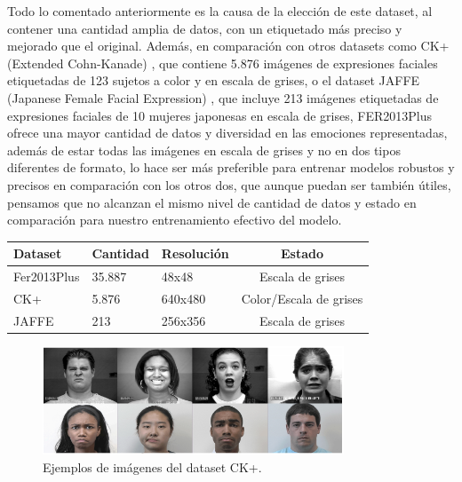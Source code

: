 \documentclass[12pt]{report} %
\begin{document}
Todo lo comentado anteriormente es la causa de la elección de este dataset, al contener una cantidad amplia de datos, con un etiquetado más preciso y mejorado que el original. Además, en comparación con otros datasets como CK+ (Extended Cohn-Kanade) \cite{ckPlus}, que contiene 5.876 imágenes de expresiones faciales etiquetadas de 123 sujetos a color y en escala de grises, o el dataset JAFFE (Japanese Female Facial Expression) \cite{jaffeDataset}, que incluye 213 imágenes etiquetadas de expresiones faciales de 10 mujeres japonesas en escala de grises, FER2013Plus ofrece una mayor cantidad de datos y diversidad en las emociones representadas, además de estar todas las imágenes en escala de grises y no en dos tipos diferentes de formato, lo hace ser más preferible para entrenar modelos robustos y precisos en comparación con los otros dos, que aunque puedan ser también útiles, pensamos que no alcanzan el mismo nivel de cantidad de datos y estado en comparación para nuestro entrenamiento efectivo del modelo.

\begin{table}[H]
	{
	  \begin{tabular}{|P{3cm}|P{3cm}|P{3cm}|c|}
		\hline
		{\textbf{Dataset}} & {\textbf{Cantidad}} & {\textbf{Resolución}} & {\textbf{Estado}} \\
		\hline
		Fer2013Plus & 35.887 & 48x48 & Escala de grises \\
		\hline
		CK+ & 5.876 & 640x480 & Color/Escala de grises \\
		\hline
		JAFFE & 213 & 256x356 & Escala de grises\\
		\hline
	  \end{tabular}
	}
\end{table}

\begin{figure}[H]
	\centering
	\includegraphics[width=0.8\textwidth]{ck+Examples.png}
	\caption{Ejemplos de imágenes del dataset CK+.}
	\label{fig:imagen34}
\end{figure}
\end{document}
